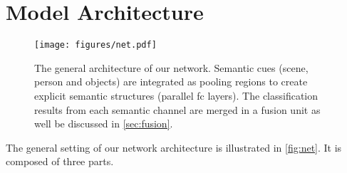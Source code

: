 \section{Model Architecture}\label{sec:modelarch}
\begin{figure}
\centering
\texttt{[image: figures/net.pdf]}
\caption[Network Architecture]{The general architecture of our network. Semantic cues (scene, person and objects) are integrated as pooling regions to create explicit semantic structures (parallel fc layers). The classification results from each semantic channel are merged in a fusion unit as well be discussed in \autoref{sec:fusion}.}
\label{fig:net}
\end{figure}
The general setting of our network architecture is illustrated in \autoref{fig:net}. It is composed of three parts.

